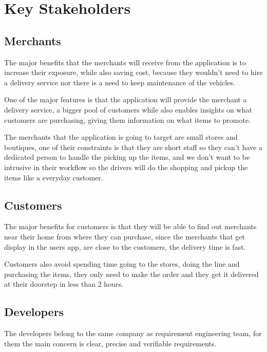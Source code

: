 \section{Key Stakeholders}

\subsection{Merchants}
The major benefits that the merchants will receive from the application is to 
increase their exposure, while also saving cost, because they wouldn't need to 
hire a delivery service nor there is a need to keep maintenance 
of the vehicles.\newline

\noindent One of the major features is that the application will provide the 
merchant a delivery service, a bigger pool of customers while also enables 
insights on what customers are purchasing, giving them information on what 
items to promote.\newline

\noindent The merchants that the application is going to target are small 
stores and boutiques, one of their constraints is that they are short staff so 
they can't have a dedicated person to handle the picking up the items, and we 
don’t want to be intrusive in their workflow so the drivers will do the 
shopping and pickup the items like a everyday customer.

\subsection{Customers}
The major benefits for customers is that they will be able to find out 
merchants near their home from where they can purchase, since the merchants 
that get display in the users app, are close to the customers, the delivery 
time is fast.\newline

\noindent Customers also avoid spending time going to the stores, doing the 
line and purchasing the items, they only need to make the order and they get 
it delivered at their doorstep in less than 2 hours.

\subsection{Developers}
The developers belong to the same company as requirement engineering team, for 
them the main concern is clear, precise and verifiable requirements.

